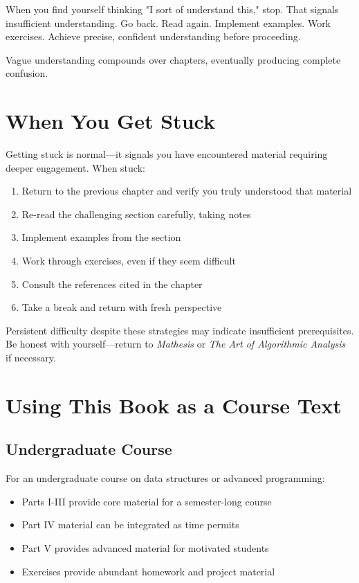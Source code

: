 When you find yourself thinking "I sort of understand this," stop. That signals insufficient understanding. Go back. Read again. Implement examples. Work exercises. Achieve precise, confident understanding before proceeding.

Vague understanding compounds over chapters, eventually producing complete confusion.

\section*{When You Get Stuck}

Getting stuck is normal—it signals you have encountered material requiring deeper engagement. When stuck:

\begin{enumerate}
    \item Return to the previous chapter and verify you truly understood that material
    \item Re-read the challenging section carefully, taking notes
    \item Implement examples from the section
    \item Work through exercises, even if they seem difficult
    \item Consult the references cited in the chapter
    \item Take a break and return with fresh perspective
\end{enumerate}

Persistent difficulty despite these strategies may indicate insufficient prerequisites. Be honest with yourself—return to \textit{Mathesis} or \textit{The Art of Algorithmic Analysis} if necessary.

\section*{Using This Book as a Course Text}

\subsection*{Undergraduate Course}

For an undergraduate course on data structures or advanced programming:

\begin{itemize}
    \item Parts I-III provide core material for a semester-long course
    \item Part IV material can be integrated as time permits
    \item Part V provides advanced material for motivated students
    \item Exercises provide abundant homework and project material
\end{itemize}

